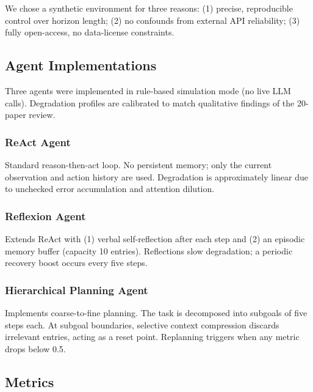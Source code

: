 \documentclass[conference]{IEEEtran}
\begin{document}
We chose a synthetic environment for three reasons: (1) precise, reproducible
control over horizon length; (2) no confounds from external API reliability;
(3) fully open-access, no data-license constraints.

\subsection{Agent Implementations}

Three agents were implemented in rule-based simulation mode (no live LLM
calls). Degradation profiles are calibrated to match qualitative findings of
the 20-paper review.

\subsubsection{ReAct Agent~\cite{yao2023react}}
Standard reason-then-act loop. No persistent memory; only the current
observation and action history are used. Degradation is approximately linear
due to unchecked error accumulation and attention dilution.

\subsubsection{Reflexion Agent~\cite{shinn2023reflexion}}
Extends ReAct with (1) verbal self-reflection after each step and (2) an
episodic memory buffer (capacity 10 entries). Reflections slow degradation; a
periodic recovery boost occurs every five steps.

\subsubsection{Hierarchical Planning Agent~\cite{aghzal2026hierarchical,tan2026coarse}}
Implements coarse-to-fine planning. The task is decomposed into subgoals of
five steps each. At subgoal boundaries, selective context compression discards
irrelevant entries, acting as a reset point. Replanning triggers when any
metric drops below 0.5.

\subsection{Metrics}
\end{document}
